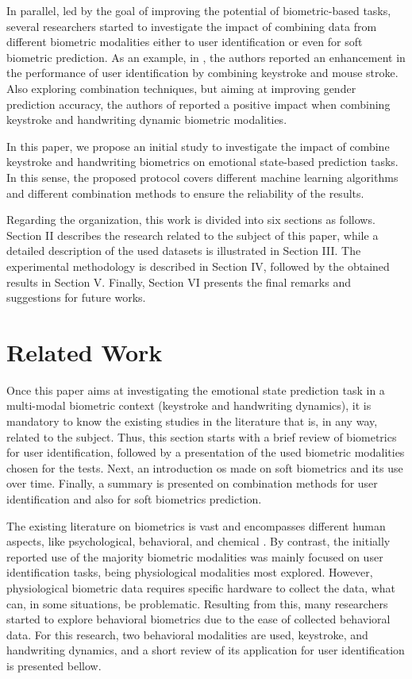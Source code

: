 \documentclass[conference]{IEEEtran}
\begin{document}
In parallel, led by the goal of improving the potential of biometric-based tasks, several researchers started to investigate the impact of combining data from different biometric modalities \cite{combine} either to user identification or even for soft biometric prediction. As an example, in \cite{marjorie-comb}, the authors reported an enhancement in the performance of user identification by combining keystroke and mouse stroke. Also exploring combination techniques, but aiming at improving gender prediction accuracy, the authors of \cite{combining-gender} reported a positive impact when combining keystroke and handwriting dynamic biometric modalities.

In this paper, we propose an initial study to investigate the impact of combine keystroke and handwriting biometrics on emotional state-based prediction tasks. In this sense, the proposed protocol covers different machine learning algorithms and different combination methods to ensure the reliability of the results.

Regarding the organization, this work is divided into six sections as follows. Section II describes the research related to the subject of this paper, while a detailed description of the used datasets is illustrated in Section III. The experimental methodology is described in Section IV, followed by the obtained results in Section V. Finally, Section VI presents the final remarks and suggestions for future works. 

\section{Related Work}\label{related-work}

Once this paper aims at investigating the emotional state prediction task in a multi-modal biometric context (keystroke and handwriting dynamics), it is mandatory to know the existing studies in the literature that is, in any way, related to the subject. Thus, this section starts with a brief review of biometrics for user identification, followed by a presentation of the used biometric modalities chosen for the tests. Next, an introduction os made on soft biometrics and its use over time. Finally, a summary is presented on combination methods for user identification and also for soft biometrics prediction.

The existing literature on biometrics is vast and encompasses different human aspects, like psychological, behavioral, and chemical \cite{handbook-biometrics} \cite{handbook-biometrics}. By contrast, the initially reported use of the majority biometric modalities was mainly focused on user identification tasks, being physiological modalities most explored. However,  physiological biometric data requires specific hardware to collect the data, what can, in some situations, be problematic. Resulting from this, many researchers started to explore behavioral biometrics due to the ease of collected behavioral data. For this research, two behavioral modalities are used, keystroke, and handwriting dynamics, and a short review of its application for user identification is presented bellow.
\end{document}
